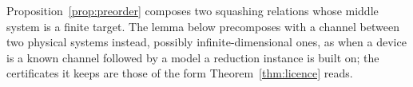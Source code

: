 
Proposition~\ref{prop:preorder} composes two squashing relations whose
middle system is a finite target. The lemma below precomposes with a channel
between two physical systems instead, possibly infinite-dimensional ones, as
when a device is a known channel followed by a model a reduction instance is
built on; the certificates it keeps are those of the form
Theorem~\ref{thm:licence} reads.

